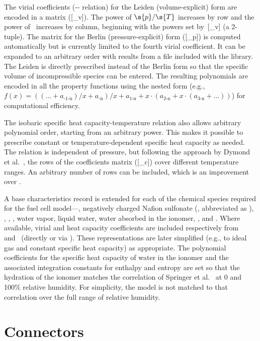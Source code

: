 The virial coefficients (-- relation) for the Leiden (volume-explicit) form are encoded in a matrix ([_v]).  The power of $\s{p}/\s{T}$ increases by row and the power of~ increases by column, beginning with the powers set by~[_v] (a 2-tuple).  The matrix for the Berlin (pressure-explicit) form ([_p]) is computed automatically but is currently limited to the fourth virial coefficient.  It can be expanded to an arbitrary order with results from a  file included with the library.  The Leiden is directly prescribed instead of the Berlin form so that the specific volume of incompressible species can be entered.  The resulting polynomials are encoded in all the property functions using the nested form (e.g., $f(x) = ((\ldots + a_\text{-1-n})/x + a_\text{-n})/x + a_\text{1-n} + x\cdot(a_\text{2-n} + x\cdot(a_\text{3-n} + \ldots))$) for computational efficiency.

The isobaric specific heat capacity-temperature relation also allows arbitrary polynomial order, starting from an arbitrary power.  This makes it possible to prescribe constant or temperature-dependent specific heat capacity as needed.  The relation is independent of pressure, but following the approach by Dymond et al.~\cite{Dymond2002}, the rows of the coefficients matrix ([_c]) cover different temperature ranges.  An arbitrary number of rows can be included, which is an improvement over .

A base characteristics record is extended for each of the chemical species required for the fuel cell model---, negatively charged Nafion sulfonate (, abbreviated as ), , , , water vapor, liquid water, water absorbed in the ionomer, , and .  Where available, virial and heat capacity coefficients are included respectively from~\cite{Dymond2002} and~\cite{McBride2002} (directly or via ).  These representations are later simplified (e.g., to ideal gas and constant specific heat capacity) as appropriate.   The polynomial coefficients for the specific heat capacity of water in the ionomer and the associated integration constants for enthalpy and entropy are set so that the hydration of the ionomer matches the correlation of Springer et al.~\cite{Springer1991} at 0 and 100\% relative humidity.  For simplicity, the model is not matched to that correlation over the full range of relative humidity.


\section{Connectors}
\label{sec:Connectors}

